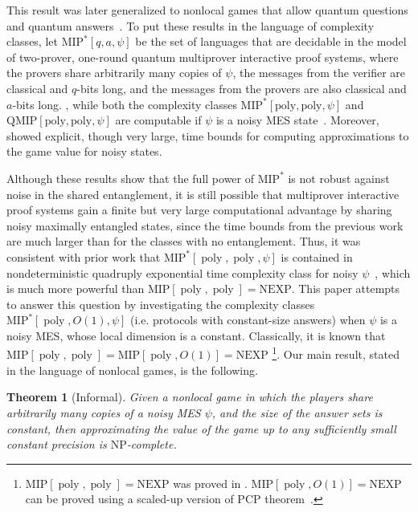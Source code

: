 \documentclass[11pt]{article}
\theoremstyle{plain}
\newtheorem{theorem}{Theorem}[section]
\theoremstyle{definition}
\newcommand {\Br} [1] {\ensuremath{ \left[ #1 \right] }}
\newcommand{\poly} {\ensuremath{\operatorname{poly}}}
\newcommand{\1}{\mathbb{1}} %
\begin{document}
This result was later generalized to nonlocal games that allow quantum questions and quantum answers~\cite{qin_et_al:LIPIcs.ICALP.2023.97}. 
To put these results in the language of complexity classes, let $\mathrm{MIP}^*\Br{q,a,\psi}$ be the set of languages that are decidable in the model of two-prover, one-round quantum multiprover interactive proof systems, where the provers share arbitrarily many copies of $\psi$, the messages from the verifier are classical and $q$-bits long, and the messages from the provers are also classical and $a$-bits long. 
\cite{Reichardt2013,JNVWYuen'20,JNVWY'20}, while both the complexity classes $\mathrm{MIP}^*\Br{\mathrm{poly},\mathrm{poly},\psi}$ and $\mathrm{QMIP}\Br{\mathrm{poly},\mathrm{poly},\psi}$ are computable if $\psi$ is a noisy MES state~\cite{qin2021nonlocal,qin_et_al:LIPIcs.ICALP.2023.97}. Moreover, \cite{qin2021nonlocal,qin_et_al:LIPIcs.ICALP.2023.97} showed explicit, though very large, time bounds for computing approximations to the game value for noisy states.  

Although these results show that the full power of $\mathrm{MIP}^*$ is not robust against noise in the shared entanglement, it is still possible that multiprover interactive proof systems gain a finite but very large computational advantage by sharing noisy maximally entangled states, since the time bounds from the previous work are much larger than for the classes with no entanglement. Thus, it was consistent with prior work that $\mathrm{MIP}^*\Br{\poly, \poly, \psi}$ is contained in  nondeterministic quadruply exponential time complexity class for noisy $\psi$~\cite{qin2021nonlocal}, which is much more powerful than $\mathrm{MIP}\Br{\poly, \poly} = \mathrm{NEXP}$. 
This paper attempts to answer this question by investigating the complexity classes $\mathrm{MIP}^*\Br{\poly,O(1),\psi}$ (i.e. protocols with constant-size answers) when $\psi$ is a noisy MES, whose local dimension is a constant. 
Classically, it is known that $\mathrm{MIP}\Br{\poly, \poly} = \mathrm{MIP}\Br{\poly, O(1)} = \mathrm{NEXP}$ \cite{Babai1991,mie2009short}\footnote{$\mathrm{MIP}\Br{\poly, \poly} =\mathrm{NEXP}$ was proved in \cite{Babai1991}. $\mathrm{MIP}\Br{\poly, O(1)} = \mathrm{NEXP}$ can be proved using a scaled-up version of PCP theorem~\cite{mie2009short}.}. Our main result, stated in the language of nonlocal games, is the following.


\begin{theorem}[Informal]
    \label{thm:informal_1}
	Given a nonlocal game in which the players share arbitrarily many copies of a noisy MES $\psi$, and the size of the answer sets is constant, then approximating the value of the game up to any sufficiently small constant precision is  $\mathrm{NP}$-complete. 
\end{theorem}
\end{document}
